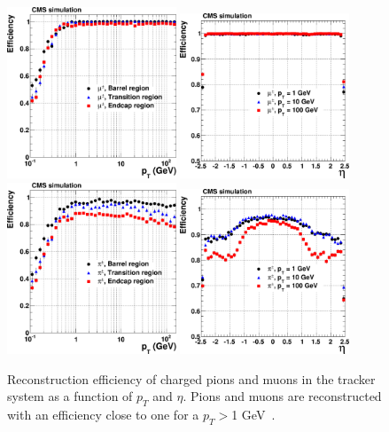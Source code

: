 \begin{figure}[!Hhtbp]
  \begin{center}
    \includegraphics[width=0.45\textwidth]{figs/eff_muon_vs_pt.png}
    \includegraphics[width=0.45\textwidth]{figs/eff_muon_vs_eta.png}
    \includegraphics[width=0.45\textwidth]{figs/eff_pion_vs_pt.png}
    \includegraphics[width=0.45\textwidth]{figs/eff_pion_vs_eta.png}
    \caption{Reconstruction efficiency of charged pions and muons in the tracker system as a function of $p_{T}$ and $\eta$. Pions and muons are reconstructed with an efficiency close to one for a $p_{T}>$1 GeV~\cite{Chatrchyan:2014fea}.}
    \label{fig:TrackerEff}
  \end{center}
\end{figure}

